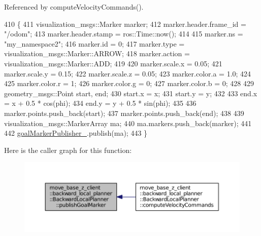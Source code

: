 Referenced by compute\+Velocity\+Commands().


\begin{DoxyCode}
410 \{
411     visualization\_msgs::Marker marker;
412     marker.header.frame\_id = \textcolor{stringliteral}{"/odom"};
413     marker.header.stamp = ros::Time::now();
414 
415     marker.ns = \textcolor{stringliteral}{"my\_namespace2"};
416     marker.id = 0;
417     marker.type = visualization\_msgs::Marker::ARROW;
418     marker.action = visualization\_msgs::Marker::ADD;
419 
420     marker.scale.x = 0.05;
421     marker.scale.y = 0.15;
422     marker.scale.z = 0.05;
423     marker.color.a = 1.0;
424 
425     marker.color.r = 1;
426     marker.color.g = 0;
427     marker.color.b = 0;
428 
429     geometry\_msgs::Point start, end;
430     start.x = x;
431     start.y = y;
432 
433     end.x = x + 0.5 * cos(phi);
434     end.y = y + 0.5 * sin(phi);
435 
436     marker.points.push\_back(start);
437     marker.points.push\_back(end);
438 
439     visualization\_msgs::MarkerArray ma;
440     ma.markers.push\_back(marker);
441 
442     \hyperlink{classmove__base__z__client_1_1backward__local__planner_1_1BackwardLocalPlanner_a7228d3fe90bc48b486e5c46d6ac5e815}{goalMarkerPublisher\_}.publish(ma);
443 \}
\end{DoxyCode}


Here is the caller graph for this function\+:
\nopagebreak
\begin{figure}[H]
\begin{center}
\leavevmode
\includegraphics[width=350pt]{classmove__base__z__client_1_1backward__local__planner_1_1BackwardLocalPlanner_a691e565d33666d2f7004e791cae29b42_icgraph}
\end{center}
\end{figure}


